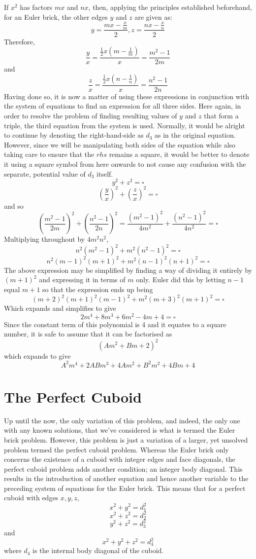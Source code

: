 \documentclass[11pt]{article}
\begin{document}
If $x^2$ has factors $mx$ and $nx$, then, applying the principles established beforehand, for an Euler brick, the other edges $y$ and $z$ are given as:
$$y=\frac{mx-\frac{x}{m}}{2}, z=\frac{nx-\frac{x}{n}}{2}$$
Therefore, 
$$\frac{y}{x}=\frac{\frac{1}{2}x(m-\frac{1}{m})}{x}=\frac{m^2-1}{2m}$$
and 
$$\frac{z}{x}=\frac{\frac{1}{2}x(n-\frac{1}{n})}{x}=\frac{n^2-1}{2n}$$
Having done so, it is now a matter of using these expressions in conjunction with the system of equations to find an expression for all three sides. Here again, in order to resolve the problem of finding resulting values of $y$ and $z$ that form a triple, the third equation from the system is used. Normally, it would be alright to continue by denoting the right-hand-side as $d_3$ as in the original equation. However, since we will be manipulating both sides of the equation while also taking care to ensure that the $rhs$ remains a square, it would be better to denote it using a square symbol from here onwards to not cause any confusion with the separate, potential value of $d_3$ itself.
$$y^2+z^2=\square$$
$$\left(\frac{y}{x}\right)^2+\left(\frac{z}{x}\right)^2=\square$$
and so
$$\left(\frac{m^2-1}{2m}\right)^2+\left(\frac{n^2-1}{2n}\right)^2=\frac{(m^2-1)^2}{4m^2}+\frac{(n^2-1)^2}{4n^2}=\square$$
Multiplying throughout by $4m^2n^2$,
$$n^2(m^2-1)^2+m^2(n^2-1)^2=\square$$
$$n^2(m-1)^2(m+1)^2+m^2(n-1)^2(n+1)^2=\square$$
The above expression may be simplified by finding a way of dividing it entirely by $(m+1)^2$ and expressing it in terms of $m$ only. Euler did this by letting $n-1$ equal $m+1$ so that the expression ends up being
$$(m+2)^2(m+1)^2(m-1)^2+m^2(m+3)^2(m+1)^2=\square$$
Which expands and simplifies to give
$$2m^4+8m^3+6m^2-4m+4=\square$$
Since the constant term of this polynomial is 4 and it equates to a square number, it is safe to assume that it can be factorised as
$$(Am^2+Bm+2)^2$$
which expands to give
$$A^2m^4+2ABm^3+4Am^2+B^2m^2+4Bm+4$$

\section{The Perfect Cuboid}
Up until the now, the only variation of this problem, and indeed, the only one with any known solutions, that we've considered is what is termed the Euler brick problem. However, this problem is just a variation of a larger, yet unsolved problem termed the perfect cuboid problem. 
Whereas the Euler brick only concerns the existence of a cuboid with integer edges and face diagonals, the perfect cuboid problem adds another condition; an integer body diagonal. This results in the introduction of another equation and hence another variable to the preceding system of equations for the Euler brick. This means that for a perfect cuboid with edges $x, y, z$,
$$x^2+y^2=d_1^2$$
$$x^2+z^2=d_2^2$$
$$y^2+z^2=d_3^2$$
and
$$x^2+y^2+z^2=d_4^2$$
where $d_4$ is the internal body diagonal of the cuboid. 
\end{document}
